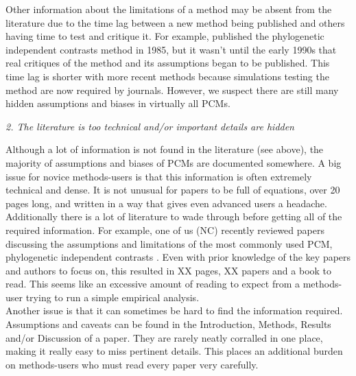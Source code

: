 \documentclass[a4paper,12pt]{article}
\renewcommand{\subsection}[1]{
  \bigskip
  \begin{center}
  \begin{large}
  \normalfont\itshape #1
  \end{large}
  \end{center}
}
\begin{document}

Other information about the limitations of a method may be absent from the literature due to the time lag between a new method being published and others having time to test and critique it. 
For example, \citet{felsenstein1985phylogenies} published the phylogenetic independent contrasts method in 1985, but it wasn't until the early 1990s that real critiques of the method and its assumptions began to be published. %
This time lag is shorter with more recent methods because simulations testing the method are now required by journals.
However, we suspect there are still many hidden assumptions and biases in virtually all PCMs.

\subsection{2. The literature is too technical and/or important details are hidden}

Although a lot of information is not found in the literature (see above), the majority of assumptions and biases of PCMs are documented somewhere. 
A big issue for novice methods-users is that this information is often extremely technical and dense.
It is not unusual for papers to be full of equations, over 20 pages long, and written in a way that gives even advanced users a headache. 
Additionally there is a lot of literature to wade through before getting all of the required information. 
For example, one of us (NC) recently reviewed papers discussing the assumptions and limitations of the most commonly used PCM, phylogenetic independent contrasts \citep{felsenstein1985phylogenies}. 
Even with prior knowledge of the key papers and authors to focus on, this resulted in XX pages, XX papers and a book to read. 
This seems like an excessive amount of reading to expect from a methods-user trying to run a simple empirical analysis.\\

Another issue is that it can sometimes be hard to find the information required. Assumptions and caveats can be found in the Introduction, Methods, Results and/or Discussion of a paper. 
They are rarely neatly corralled in one place, making it really easy to miss pertinent details. 
This places an additional burden on methods-users who must read every paper very carefully.
\end{document}

